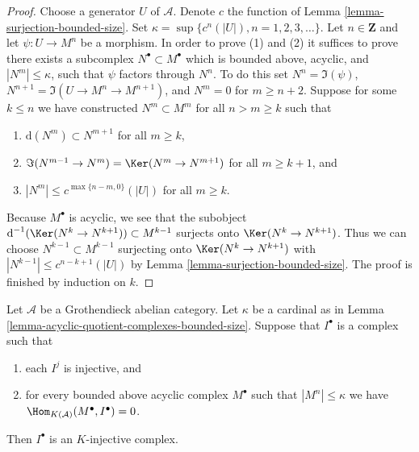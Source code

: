 \begin{proof}
Choose a generator $U$ of $\mathcal{A}$. Denote $c$ the function of
Lemma \ref{lemma-surjection-bounded-size}.
Set $\kappa = \sup \{c^n(|U|), n = 1, 2, 3, \ldots\}$.
Let $n \in \mathbf{Z}$ and let $\psi : U \to M^n$ be a morphism.
In order to prove (1) and (2) it suffices to prove there exists a subcomplex
$N^\bullet \subset M^\bullet$ which is bounded above, acyclic, and
$|N^m| \leq \kappa$, such that $\psi$ factors through $N^n$.
To do this set $N^n = \Im(\psi)$, $N^{n + 1} = \Im(U \to M^n \to M^{n + 1})$,
and $N^m = 0$ for $m \geq n + 2$.
Suppose for some $k \leq n$ we have constructed $N^m \subset M^m$
for all $n > m \geq k$ such that
\begin{enumerate}
\item $\text{d}(N^m) \subset N^{m + 1}$ for all $m \geq k$,
\item $\Im(N^{m - 1} \to N^m) = \Ker(N^m \to N^{m + 1})$ for
all $m \geq k + 1$, and
\item $|N^m| \leq c^{\max\{n - m, 0\}}(|U|)$ for all $m \geq k$.
\end{enumerate}
Because $M^\bullet$ is acyclic, we see that the subobject
$\text{d}^{-1}(\Ker(N^k \to N^{k + 1})) \subset M^{k - 1}$ surjects onto
$\Ker(N^k \to N^{k + 1})$. Thus we can choose $N^{k - 1} \subset M^{k - 1}$
surjecting onto $\Ker(N^k \to N^{k + 1})$ with
$|N^{k - 1}| \leq c^{n - k + 1}(|U|)$ by
Lemma \ref{lemma-surjection-bounded-size}. The proof is finished by
induction on $k$.
\end{proof}

\begin{lemma}
\label{lemma-characterize-K-injective}
Let $\mathcal{A}$ be a Grothendieck abelian category.
Let $\kappa$ be a cardinal as in
Lemma \ref{lemma-acyclic-quotient-complexes-bounded-size}.
Suppose that $I^\bullet$ is a complex such that
\begin{enumerate}
\item each $I^j$ is injective, and
\item for every bounded above acyclic complex $M^\bullet$
such that $|M^n| \leq \kappa$
we have $\Hom_{K(\mathcal{A})}(M^\bullet, I^\bullet) = 0$.
\end{enumerate}
Then $I^\bullet$ is an $K$-injective complex.
\end{lemma}

